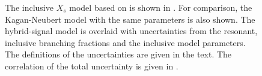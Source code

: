 \begin{figure}[htbp!]
    \centering
    \caption{\label{fig:hybrid_uncertainty_all}
    The inclusive $X_s$ model based on  is shown in .
    For comparison, the Kagan-Neubert model with the same parameters is also shown.
    The hybrid-signal model is overlaid with uncertainties from the resonant, inclusive branching fractions and the inclusive model parameters.
    The definitions of the uncertainties are given in the text.
    The correlation of the total uncertainty is given in .
    }
\end{figure}


